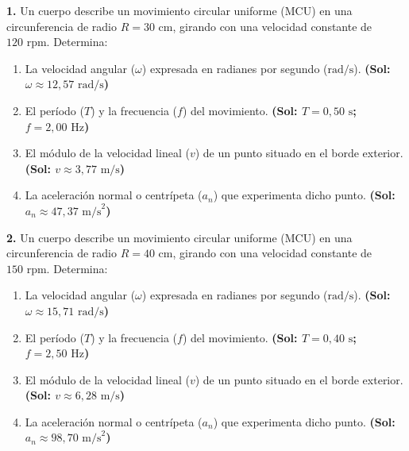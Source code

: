 \documentclass[11pt,a4paper]{article}
\begin{document}
\pagestyle{empty}

\noindent\textbf{1.} Un cuerpo describe un movimiento circular uniforme (MCU) en una circunferencia de radio $R = 30\text{ cm}$, girando con una velocidad constante de $120\text{ rpm}$. Determina:
\begin{enumerate}[label=\textbf{\alph*)}, leftmargin=2em, itemsep=4pt]
    \item La velocidad angular ($\omega$) expresada en radianes por segundo ($\text{rad/s}$). \hfill \textbf{(Sol: $\omega \approx 12{,}57\text{ rad/s}$)}
    \item El período ($T$) y la frecuencia ($f$) del movimiento. \hfill \textbf{(Sol: $T = 0{,}50\text{ s}$; $f = 2{,}00\text{ Hz}$)}
    \item El módulo de la velocidad lineal ($v$) de un punto situado en el borde exterior. \hfill \textbf{(Sol: $v \approx 3{,}77\text{ m/s}$)}
    \item La aceleración normal o centrípeta ($a_n$) que experimenta dicho punto. \hfill \textbf{(Sol: $a_n \approx 47{,}37\text{ m/s}^2$)}
\end{enumerate}

\vspace{0.6cm}
\noindent\textbf{2.} Un cuerpo describe un movimiento circular uniforme (MCU) en una circunferencia de radio $R = 40\text{ cm}$, girando con una velocidad constante de $150\text{ rpm}$. Determina:
\begin{enumerate}[label=\textbf{\alph*)}, leftmargin=2em, itemsep=4pt]
    \item La velocidad angular ($\omega$) expresada en radianes por segundo ($\text{rad/s}$). \hfill \textbf{(Sol: $\omega \approx 15{,}71\text{ rad/s}$)}
    \item El período ($T$) y la frecuencia ($f$) del movimiento. \hfill \textbf{(Sol: $T = 0{,}40\text{ s}$; $f = 2{,}50\text{ Hz}$)}
    \item El módulo de la velocidad lineal ($v$) de un punto situado en el borde exterior. \hfill \textbf{(Sol: $v \approx 6{,}28\text{ m/s}$)}
    \item La aceleración normal o centrípeta ($a_n$) que experimenta dicho punto. \hfill \textbf{(Sol: $a_n \approx 98{,}70\text{ m/s}^2$)}
\end{enumerate}
\end{document}
